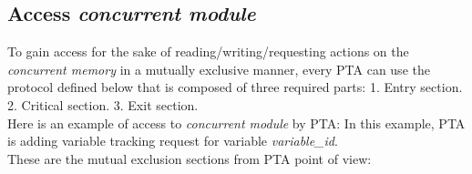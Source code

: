 \subsection{Access \textit{concurrent module}}
To gain access for the sake of reading/writing/requesting actions on the \textit{concurrent memory} in a mutually exclusive manner, every PTA can use the protocol defined below that is composed of three required parts: 1. Entry section. 2. Critical section. 3. Exit section.\\
Here is an example of access to \textit{concurrent module} by PTA:  In this example, PTA is adding variable tracking request for variable \textcolor{ColorEdgeGuard}{\textit{variable_id}}.\\
These are the mutual exclusion sections from PTA point of view: 
